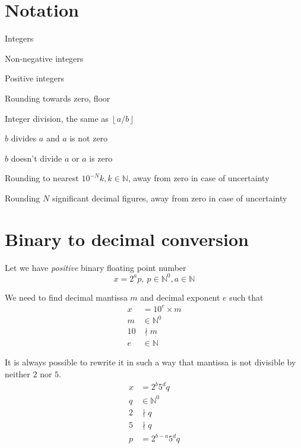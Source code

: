 \documentclass[english]{article}
\newcommand{\idiv}{\backslash}
\newcommand{\llb}{\llbracket}
\newcommand{\rrb}{\rrbracket}
\begin{document}
\section{Notation}

\begin{description}[leftmargin=!, labelwidth=1cm]
    \item [$\mathbb{N}$]                  Integers
    \item [$\mathbb{N}^0$]                Non-negative integers
    \item [$\mathbb{N}^+$]                Positive integers
    \item [$\lfloor a \rfloor$]           Rounding towards zero, floor
    \item [$a \idiv b$]                   Integer division, the same as $\left\lfloor a/b \right\rfloor$
    \item [$b \mid a$]                    $b$ divides $a$ and $a$ is not zero
    \item [$b \nmid a$]                   $b$ doesn't divide $a$ or $a$ is zero
    \item [{$\left[a \right]_N$}]         Rounding to nearest $10^{-N}k, k \in \mathbb{N}$, away from zero in case of uncertainty
    \item [{$\left\llb a \right\rrb_N$}]  Rounding $N$ significant decimal figures, away from zero in case of uncertainty
\end{description}

\section{Binary to decimal conversion}

Let we have \emph{positive} binary floating point number
\begin{equation}
    x = 2^{a}p,\: p \in \mathbb{N}^0, a \in \mathbb{N}
\end{equation}

We need to find decimal mantissa $m$ and decimal exponent $e$ such that
\begin{align*}
    x & = 10^e \times m \\
    m & \in \mathbb{N}^0 \\
    10 & \nmid m \\
    e & \in \mathbb{N}
\end{align*}

It is always possible to rewrite it in such a way
that mantissa is not divisible by neither $2$ nor $5$.
\begin{align}
    x & = 2^b 5^d q \label{canon} \\
    q & \in \mathbb{N}^0 \nonumber \\
    2 & \nmid q \nonumber \\
    5 & \nmid q \nonumber \\
    p & = 2^{b-a} 5^d q \nonumber
\end{align}
\end{document}
